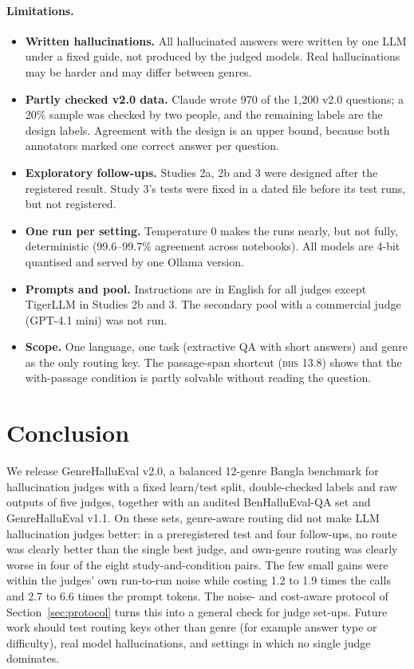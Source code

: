 \documentclass[11pt]{article}
\newcommand{\BHS}{\textsc{bhs}}
\begin{document}
\paragraph{Limitations.}
\begin{itemize}
  \item \textbf{Written hallucinations.} All hallucinated answers were written by one LLM under a fixed guide, not
  produced by the judged models. Real hallucinations may be harder and may differ between genres.
  \item \textbf{Partly checked v2.0 data.} Claude wrote 970 of the 1,200 v2.0 questions; a 20\% sample was checked by
  two people, and the remaining labels are the design labels. Agreement with the design is an upper bound, because
  both annotators marked one correct answer per question.
  \item \textbf{Exploratory follow-ups.} Studies 2a, 2b and 3 were designed after the registered result. Study 3's
  tests were fixed in a dated file before its test runs, but not registered.
  \item \textbf{One run per setting.} Temperature 0 makes the runs nearly, but not fully, deterministic (99.6--99.7\%
  agreement across notebooks). All models are 4-bit quantised and served by one Ollama version.
  \item \textbf{Prompts and pool.} Instructions are in English for all judges except TigerLLM in Studies 2b and 3.
  The secondary pool with a commercial judge (GPT-4.1 mini) was not run.
  \item \textbf{Scope.} One language, one task (extractive QA with short answers) and genre as the only routing key.
  The passage-span shortcut (\BHS{} 13.8) shows that the with-passage condition is partly solvable without reading the
  question.
\end{itemize}

\section{Conclusion}

We release GenreHalluEval v2.0, a balanced 12-genre Bangla benchmark for hallucination judges with a fixed
learn/test split, double-checked labels and raw outputs of five judges, together with an audited BenHalluEval-QA set
and GenreHalluEval v1.1. On these sets, genre-aware routing did not make LLM hallucination judges better: in a
preregistered test and four follow-ups, no route was clearly better than the single best judge, and own-genre routing
was clearly worse in four of the eight study-and-condition pairs. The few small gains were within the judges' own
run-to-run noise while costing 1.2 to 1.9 times the calls and 2.7 to 6.6 times the prompt tokens. The noise- and
cost-aware protocol of Section~\ref{sec:protocol} turns this into a general check for judge set-ups. Future work should
test routing keys other than genre (for example answer type or difficulty), real model hallucinations, and settings in
which no single judge dominates.
\end{document}
